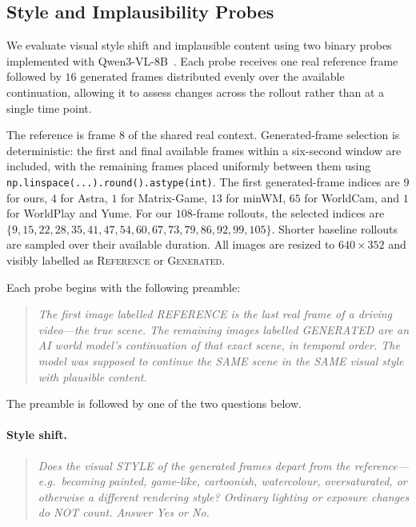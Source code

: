 \documentclass[letterpaper]{article} %
\begin{document}
\subsection{Style and Implausibility Probes}
\label{app:vlm_quality_probes}

We evaluate visual style shift and implausible content using two binary probes
implemented with Qwen3-VL-8B~\cite{QWEN}. Each probe receives one real
reference frame followed by $16$ generated frames distributed evenly over
the available continuation, allowing it to assess changes across the rollout
rather than at a single time point.

The reference is frame $8$ of the shared real context. Generated-frame
selection is deterministic: the first and final available frames within a
six-second window are included, with the remaining frames placed uniformly
between them using \verb|np.linspace(...).round().astype(int)|. The first
generated-frame indices are $9$ for ours, $4$ for Astra, $1$ for Matrix-Game,
$13$ for minWM, $65$ for WorldCam, and $1$ for WorldPlay and Yume. For our
$108$-frame rollouts, the selected indices are
$\{9,15,22,28,35,41,47,54,60,67,73,79,86,92,99,105\}$. Shorter baseline
rollouts are sampled over their available duration. All images are resized to
$640\times352$ and visibly labelled as \textsc{Reference} or
\textsc{Generated}.

Each probe begins with the following preamble:

\begin{quote}
\small
\emph{The first image labelled REFERENCE is the last real frame of a driving
video---the true scene. The remaining images labelled GENERATED are an AI
world model's continuation of that exact scene, in temporal order. The model
was supposed to continue the SAME scene in the SAME visual style with
plausible content.}
\end{quote}

The preamble is followed by one of the two questions below.

\paragraph{Style shift.}
\begin{quote}
\small
\emph{Does the visual STYLE of the generated frames depart from the
reference---e.g.\ becoming painted, game-like, cartoonish, watercolour,
oversaturated, or otherwise a different rendering style? Ordinary lighting
or exposure changes do NOT count. Answer Yes or No.}
\end{quote}
\end{document}
